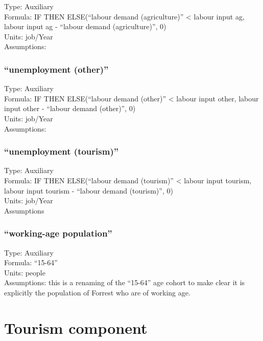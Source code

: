 \documentclass[
  11pt,
]{book}
\begin{document}
Type: Auxiliary\\
Formula: IF THEN ELSE(``labour demand (agriculture)'' \textless{} labour input ag, labour input ag - ``labour demand (agriculture)'', 0)\\
Units: job/Year\\
Assumptions:

\hypertarget{unemployment-other}{%
\subsection{``unemployment (other)''}\label{unemployment-other}}

Type: Auxiliary\\
Formula: IF THEN ELSE(``labour demand (other)'' \textless{} labour input other, labour input other - ``labour demand (other)'', 0)\\
Units: job/Year\\
Assumptions:

\hypertarget{unemployment-tourism}{%
\subsection{``unemployment (tourism)''}\label{unemployment-tourism}}

Type: Auxiliary\\
Formula: IF THEN ELSE(``labour demand (tourism)'' \textless{} labour input tourism, labour input tourism - ``labour demand (tourism)'', 0)\\
Units: job/Year\\
Assumptions

\hypertarget{working-age-population}{%
\subsection{``working-age population''}\label{working-age-population}}

Type: Auxiliary\\
Formula: ``15-64''\\
Units: people\\
Assumptions: this is a renaming of the ``15-64'' age cohort to make clear it is explicitly the population of Forrest who are of working age.

\hypertarget{tourism-component}{%
\chapter{Tourism component}\label{tourism-component}}
\end{document}
